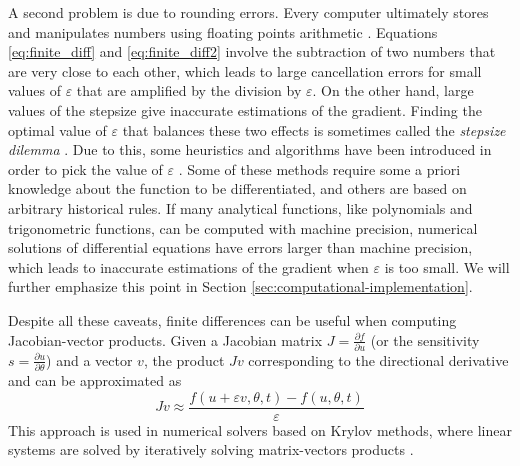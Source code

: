 A second problem is due to rounding errors.
Every computer ultimately stores and manipulates numbers using floating points arithmetic \cite{Goldberg_1991_floatingpoint}. 
Equations \eqref{eq:finite_diff} and \eqref{eq:finite_diff2} involve the subtraction of two numbers that are very close to each other, which leads to large cancellation errors for small values of $\varepsilon$ that are amplified by the division by $\varepsilon$.
On the other hand, large values of the stepsize give inaccurate estimations of the gradient. 
Finding the optimal value of $\varepsilon$ that balances these two effects is sometimes called the \textit{stepsize dilemma} \cite{mathur2012stepsize-finitediff}. 
Due to this, some heuristics and algorithms have been introduced in order to pick the value of $\varepsilon$ \cite{mathur2012stepsize-finitediff, BARTON_1992_finite_diff, SUNDIALS-hindmarsh2005sundials}. 
Some of these methods require some a priori knowledge about the function to be differentiated, and others are based on arbitrary historical rules. 
If many analytical functions, like polynomials and trigonometric functions, can be computed with machine precision, numerical solutions of differential equations have errors larger than machine precision, which leads to inaccurate estimations of the gradient when $\varepsilon$ is too small. 
We will further emphasize this point in Section \ref{sec:computational-implementation}.

Despite all these caveats, finite differences can be useful when computing Jacobian-vector products. 
Given a Jacobian matrix $J = \frac{\partial f}{\partial u}$ (or the sensitivity $s = \frac{\partial u}{\partial \theta}$) and a vector $v$, the product $Jv$ corresponding to the directional derivative and can be approximated as 
\begin{equation}
    Jv \approx \frac{f(u + \varepsilon v, \theta, t) - f(u, \theta, t)}{\varepsilon}
\end{equation}
This approach is used in numerical solvers based on Krylov methods, where linear systems are solved by iteratively solving matrix-vectors products \cite{Ipsen_Meyer_1998}.

